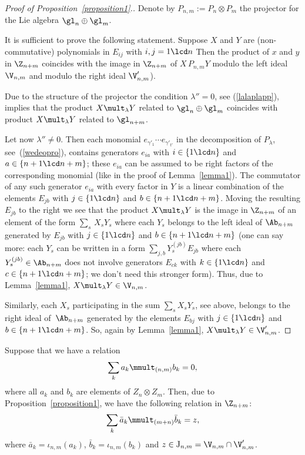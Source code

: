 \documentclass[pdftex]{sigma}
\numberwithin{equation}{section}
\begin{document}
\begin{proof}[Proof  of Proposition~\ref{proposition1}.] Denote by $P_{n,m}:=P_n\otimes P_m$ the projector for the Lie algebra $\gl_{n}\oplus \gl_m$.


It is suf\/f\/icient to prove the following statement. Suppose $X$ and $Y$ are (non-commutative) polynomials in $E_{ij}$ with $i,j=1\lcd n$
Then the product of $x$ and $y$ in $\Z_{n+m}$ coincides with the image in $\Z_{n+m}$ of $X\, P_{n,m} Y$ modulo the left ideal $\V_{n,m}$
and modulo the right ideal $\V'_{n,m}$).


Due to the structure of the projector the condition $\lambda''=0$, see (\ref{lalaplapp}), implies that
the product $X\mult_\lambda Y$ related to $\gl_n\oplus \gl_m$ coincides with product $X\mult_\lambda Y$ related to $\gl_{n+m}$.


Let now $\lambda''\not=0$. Then
each monomial $e_{\gamma'_{1}}\cdots e_{\gamma'_{t'}}$ in the decomposition of $P_\lambda$, see~(\ref{wedeopro}), contains generators $e_{ia}$ with $i\in\{1\lcd n\}$ and  $a\in\{ n+1\lcd n+m\}$; these $e_{ia}$ can be assumed to be right factors of the corresponding monomial
(like in the proof of Lemma~\ref{lemma1}). The commutator of any such generator $e_{ia}$ with
every factor in $Y$ is a linear combination of the elements $E_{jb}$ with $j\in\{ 1\lcd n\}$ and
$b\in\{ n+1\lcd n+m\}$. Moving the resulting $E_{jb}$ to the right we see that the product $X\mult_\lambda Y$ is the image in $\Z_{n+m}$ of an element
of the form $\sum_s\, X_sY_s$ where each $Y_s$ belongs to the left ideal of $\Ab_{n+m}$ generated by $E_{jb}$ with
$j\in\{ 1\lcd n\}$ and $b\in\{ n+1\lcd n+m\}$ (one can say more: each $Y_s$ can be written in a form $\sum_{j,b}  Y_s^{(jb)}
E_{jb}$ where each $Y_s^{(jb)}\in\Ab_{n+m}$ does not involve generators $E_{ck}$ with $k\in\{ 1\lcd n\}$ and $c\in\{ n+1\lcd n+m\}$; we don't need
this stronger form). Thus, due to Lemma~\ref{lemma1}, $X\mult_\lambda Y\in\V_{n,m}$.


Similarly, each $X_s$ participating in the sum $\sum_s  X_sY_s$, see above, belongs to the right ideal of~$\Ab_{n+m}$ generated by the elements $E_{bj}$ with
$j\in\{ 1\lcd n\}$ and $b\in\{ n+1\lcd n+m\}$. So, again by Lemma~\ref{lemma1}, $X\mult_\lambda Y\in\V'_{n,m}$.
\end{proof}


Suppose that we have a relation
\begin{gather}
\sum_k a_k\mmult_{(n,m)} b_k=0 , \label{st1}
\end{gather}
where all $a_k$ and $b_k$ are elements of $Z_n\otimes Z_m$. Then, due to Proposition~\ref{proposition1}, we have the following relation in $\Z_{n+m}$:
 \begin{gather}
 \sum_k \bar{a}_k\mmult_{(m+n)} \bar{b}_k=z  , \label{st2}
\end{gather}
where $\bar{a}_k=\iota_{n,m}(a_k)$, $\bar{b}_k=\iota_{n,m}(b_k)$ and $z\in \mathrm{J}_{n,m}=\V_{n,m}\cap\V'_{n,m}$.
\end{document}
